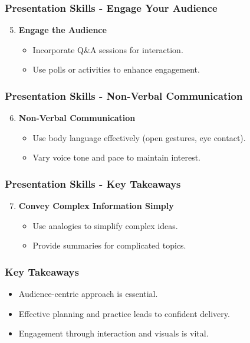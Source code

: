 \documentclass[aspectratio=169]{beamer}
\begin{document}
\begin{frame}[fragile]
    \frametitle{Presentation Skills - Engage Your Audience}
    \begin{enumerate}
        \setcounter{enumi}{4}
        \item \textbf{Engage the Audience}
        \begin{itemize}
            \item Incorporate Q\&A sessions for interaction.
            \item Use polls or activities to enhance engagement.
        \end{itemize}
    \end{enumerate}
\end{frame}

\begin{frame}[fragile]
    \frametitle{Presentation Skills - Non-Verbal Communication}
    \begin{enumerate}
        \setcounter{enumi}{5}
        \item \textbf{Non-Verbal Communication}
        \begin{itemize}
            \item Use body language effectively (open gestures, eye contact).
            \item Vary voice tone and pace to maintain interest.
        \end{itemize}
    \end{enumerate}
\end{frame}

\begin{frame}[fragile]
    \frametitle{Presentation Skills - Key Takeaways}
    \begin{enumerate}
        \setcounter{enumi}{6}
        \item \textbf{Convey Complex Information Simply}
        \begin{itemize}
            \item Use analogies to simplify complex ideas.
            \item Provide summaries for complicated topics.
        \end{itemize}
    \end{enumerate}
\end{frame}

\begin{frame}[fragile]
    \frametitle{Key Takeaways}
    \begin{itemize}
        \item Audience-centric approach is essential.
        \item Effective planning and practice leads to confident delivery.
        \item Engagement through interaction and visuals is vital.
    \end{itemize}
\end{frame}
\end{document}
